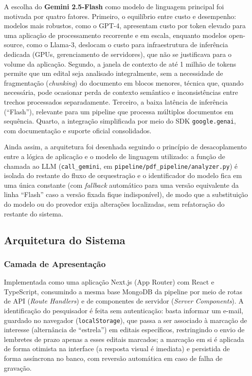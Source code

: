 \documentclass[12pt]{article}
\begin{document}
  A escolha do \textbf{Gemini 2.5-Flash} como modelo de linguagem principal foi motivada por quatro fatores. Primeiro, o equilíbrio entre custo e desempenho: modelos mais robustos, como o GPT-4, apresentam custo por token elevado para uma aplicação de processamento recorrente e em escala, enquanto modelos open-source, como o Llama-3, deslocam o custo para infraestrutura de inferência dedicada (GPUs, gerenciamento de servidores), que não se justificava para o volume da aplicação. Segundo, a janela de contexto de até 1 milhão de tokens permite que um edital seja analisado integralmente, sem a necessidade de fragmentação (\emph{chunking}) do documento em blocos menores, técnica que, quando necessária, pode ocasionar perda de contexto semântico e inconsistências entre trechos processados separadamente. Terceiro, a baixa latência de inferência (``Flash''), relevante para um pipeline que processa múltiplos documentos em sequência. Quarto, a integração simplificada por meio do SDK \texttt{google.genai}, com documentação e suporte oficial consolidados.

  Ainda assim, a arquitetura foi desenhada seguindo o princípio de desacoplamento entre a lógica de aplicação e o modelo de linguagem utilizado: a função de chamada ao LLM (\texttt{call\_gemini}, em \texttt{pipeline/pdf\_pipeline/analyzer.py}) é isolada do restante do fluxo de orquestração e o identificador do modelo fica em uma única constante (com \emph{fallback} automático para uma versão equivalente da linha ``Flash'' caso a versão fixada fique indisponível), de modo que a substituição do modelo ou do provedor exija alterações localizadas, sem refatoração do restante do sistema.

  \subsection{Arquitetura do Sistema}\label{sec:arquitetura-do-sistema}

  \subsubsection{Camada de Apresentação}\label{sec:camada-de-apresentacao}
  Implementada como uma aplicação Next.js (App Router) com React e TypeScript, consumindo a mesma base MongoDB da pipeline por meio de rotas de API (\emph{Route Handlers}) e de componentes de servidor (\emph{Server Components}). A identificação do pesquisador é feita sem autenticação: basta informar um e-mail, guardado no navegador (\texttt{localStorage}), que passa a ser associado à marcação de interesse (alternância de ``estrela'') em editais específicos, restringindo o envio de lembretes de prazo apenas a esses editais marcados; a marcação em si é aplicada de forma otimista na interface (a resposta visual é imediata) e persistida de forma assíncrona no banco, com reversão automática em caso de falha de gravação.
\end{document}
